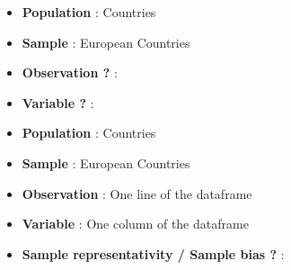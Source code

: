 \documentclass{beamer}
\begin{document}
\begin{frame}
    \begin{itemize}
        \item \textbf{Population} : Countries
        \vspace{0.2cm}
        \item \textbf{Sample} : European Countries
        \vspace{0.2cm}
        \item \textbf{Observation ?} : 
        \vspace{0.2cm}
        \item \textbf{Variable ?} : 
        \vspace{0.2cm}
    \end{itemize}
\end{frame}


\begin{frame}
    \begin{itemize}
        \item \textbf{Population} : Countries
        \vspace{0.2cm}
        \item \textbf{Sample} : European Countries
        \vspace{0.2cm}
        \item \textbf{Observation} : One line of the dataframe
        \vspace{0.2cm}
        \item \textbf{Variable} : One column of the dataframe
        \vspace{0.2cm}
        \item \textbf{Sample representativity / Sample bias ?} :
    \end{itemize}
\end{frame}
\end{document}
